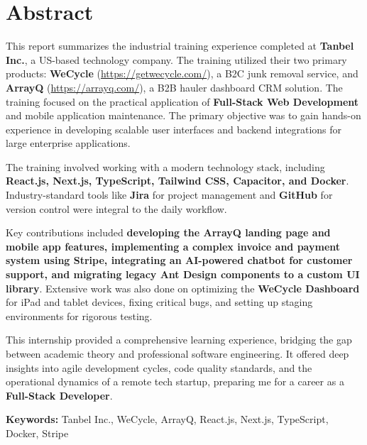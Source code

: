 \chapter*{\centering Abstract}

\par
This report summarizes the industrial training experience completed at \textbf{Tanbel Inc.}, a US-based technology company. The training utilized their two primary products: \textbf{WeCycle} (\href{https://getwecycle.com/}{https://getwecycle.com/}), a B2C junk removal service, and \textbf{ArrayQ} (\href{https://arrayq.com/}{https://arrayq.com/}), a B2B hauler dashboard CRM solution. The training focused on the practical application of \textbf{Full-Stack Web Development} and mobile application maintenance. The primary objective was to gain hands-on experience in developing scalable user interfaces and backend integrations for large enterprise applications.
\par
The training involved working with a modern technology stack, including \textbf{React.js, Next.js, TypeScript, Tailwind CSS, Capacitor, and Docker}. Industry-standard tools like \textbf{Jira} for project management and \textbf{GitHub} for version control were integral to the daily workflow.
\par
Key contributions included \textbf{developing the ArrayQ landing page and mobile app features, implementing a complex invoice and payment system using Stripe, integrating an AI-powered chatbot for customer support, and migrating legacy Ant Design components to a custom UI library}. Extensive work was also done on optimizing the \textbf{WeCycle Dashboard} for iPad and tablet devices, fixing critical bugs, and setting up staging environments for rigorous testing.
\par
This internship provided a comprehensive learning experience, bridging the gap between academic theory and professional software engineering. It offered deep insights into agile development cycles, code quality standards, and the operational dynamics of a remote tech startup, preparing me for a career as a \textbf{Full-Stack Developer}.

\vspace{0.5cm}

\noindent\textbf{Keywords:}
Tanbel Inc., WeCycle, ArrayQ, React.js, Next.js, TypeScript, Docker, Stripe
